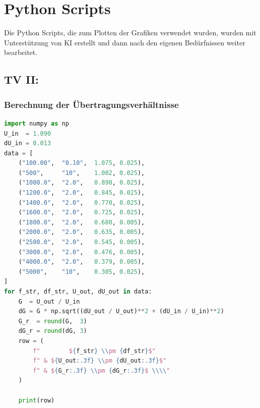 \documentclass{report}
\begin{document}
\section{Python Scripts}
Die Python Scripts, die zum Plotten der Grafiken verwendet wurden, wurden mit Unterstützung von KI erstellt und dann nach den eigenen Bedürfnissen weiter
bearbeitet.
\subsection{TV II:}
\subsubsection{Berechnung der Übertragungsverhältnisse}
\label{scr:UebertragungsverhaeltnisBerechnung}
\begin{scriptsize}
\lstset{style=python}
\begin{lstlisting}[language=python]
import numpy as np
U_in  = 1.090
dU_in = 0.013
data = [
    ("100.00",  "0.10",  1.075, 0.025),
    ("500",     "10",    1.002, 0.025),
    ("1000.0",  "2.0",   0.890, 0.025),
    ("1200.0",  "2.0",   0.845, 0.025),
    ("1400.0",  "2.0",   0.770, 0.025),
    ("1600.0",  "2.0",   0.725, 0.025),
    ("1800.0",  "2.0",   0.680, 0.005),
    ("2000.0",  "2.0",   0.635, 0.005),
    ("2500.0",  "2.0",   0.545, 0.005),
    ("3000.0",  "2.0",   0.476, 0.005),
    ("4000.0",  "2.0",   0.379, 0.005),
    ("5000",    "10",    0.305, 0.025),
]
for f_str, df_str, U_out, dU_out in data:
    G  = U_out / U_in
    dG = G * np.sqrt((dU_out / U_out)**2 + (dU_in / U_in)**2)
    G_r  = round(G,  3)
    dG_r = round(dG, 3)
    row = (
        f"        ${f_str} \\pm {df_str}$"
        f" & ${U_out:.3f} \\pm {dU_out:.3f}$"
        f" & ${G_r:.3f} \\pm {dG_r:.3f}$ \\\\"
    )

    print(row)

\end{lstlisting}
\end{scriptsize}
\end{document}
